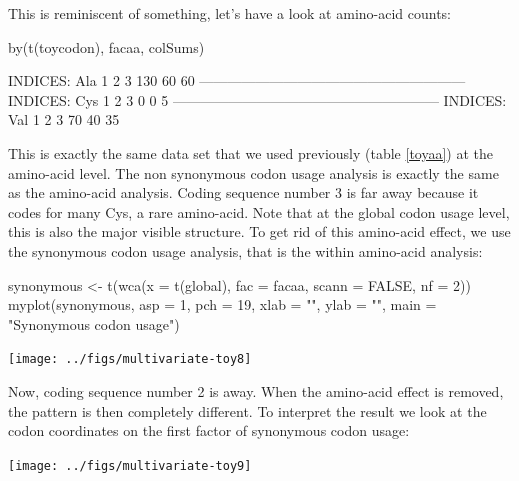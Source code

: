 \documentclass{article}
\begin{document}
This is reminiscent of something, let's have a look at amino-acid counts:

\begin{Schunk}
\begin{Sinput}
 by(t(toycodon), facaa, colSums)
\end{Sinput}
\begin{Soutput}
INDICES: Ala
  1   2   3 
130  60  60 
--------------------------------------------------------- 
INDICES: Cys
1 2 3 
0 0 5 
--------------------------------------------------------- 
INDICES: Val
 1  2  3 
70 40 35 
\end{Soutput}
\end{Schunk}

This is exactly the same data set that we used previously (table \ref{toyaa}) at the amino-acid
level. The non synonymous codon usage analysis is exactly the same as the amino-acid analysis.
Coding sequence number 3 is far away because it codes for many Cys, a rare amino-acid. Note
that at the global codon usage level, this is also the major visible structure. To get rid of this
amino-acid effect, we use the synonymous codon usage analysis, that is the within amino-acid
analysis:

\begin{Schunk}
\begin{Sinput}
 synonymous <- t(wca(x = t(global), fac = facaa, scann = FALSE, nf = 2))
 myplot(synonymous, asp = 1, pch = 19, xlab = "", ylab = "", main = "Synonymous codon usage")
\end{Sinput}
\end{Schunk}
\texttt{[image: ../figs/multivariate-toy8]}

Now, coding sequence number 2 is away. When the amino-acid effect is removed, the pattern is then
completely different. To interpret the result we look at the codon coordinates on the first factor of
synonymous codon usage:

\begin{Schunk}
\end{Schunk}
\texttt{[image: ../figs/multivariate-toy9]}
\end{document}
